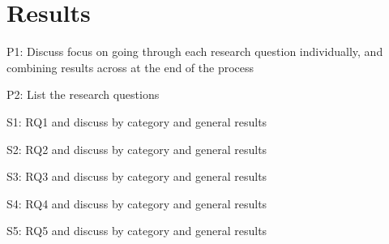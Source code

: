 \section{Results} \label{sec:results}

P1: Discuss focus on going through each research question individually, and combining results across at the end of the process

P2: List the research questions

S1: RQ1 and discuss by category and general results

S2: RQ2 and discuss by category and general results

S3: RQ3 and discuss by category and general results

S4: RQ4 and discuss by category and general results

S5: RQ5 and discuss by category and general results
